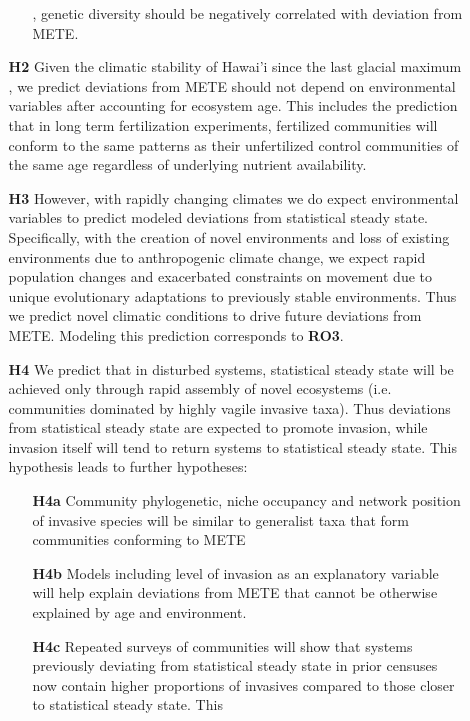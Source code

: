 \documentclass[11pt]{article}
\begin{document}
\begin{itemize}
\begin{itemize}
\begin{itemize}
      \citep{gillespie2010popgen}, genetic diversity should be
      negatively correlated with deviation from METE.
    \end{itemize}
  \item[{\bf H2}] Given the climatic stability of Hawai'i since the
    last glacial maximum \citep{gavenda1992}, we predict deviations
    from METE should not depend on environmental variables after
    accounting for ecosystem age.  This includes the prediction that
    in long term fertilization experiments, fertilized communities
    will conform to the same patterns as their unfertilized control
    communities of the same age regardless of underlying nutrient
    availability.
  \item[{\bf H3}] However, with rapidly changing climates we do expect
    environmental variables to predict modeled deviations from
    statistical steady state. Specifically, with the creation of novel
    environments and loss of existing environments due to
    anthropogenic climate change, we expect rapid population changes
    and exacerbated constraints on movement due to unique evolutionary
    adaptations to previously stable environments.  Thus we predict
    novel climatic conditions to drive future deviations from
    METE. Modeling this prediction corresponds to {\bf RO3}.
  \item[{\bf H4}] We predict that in disturbed systems, statistical steady
    state will be achieved only through rapid assembly of novel
    ecosystems (i.e. communities dominated by highly vagile invasive
    taxa).  Thus deviations from statistical steady state are expected
    to promote invasion, while invasion itself will tend to return
    systems to statistical steady state.  This hypothesis leads to
    further hypotheses:
    \begin{itemize}
    \item[{\bf H4a}] Community phylogenetic, niche occupancy and network
      position of invasive species will be similar to generalist taxa
      that form communities conforming to METE
    \item[{\bf H4b}] Models including level of invasion as an
      explanatory variable will help explain deviations from METE that
      cannot be otherwise explained by age and environment.
    \item[{\bf H4c}] Repeated surveys of communities will show that
      systems previously deviating from statistical steady state in
      prior censuses now contain higher proportions of invasives
      compared to those closer to statistical steady state.  This

\end{itemize}
\end{itemize}
\end{itemize}
\end{document}
